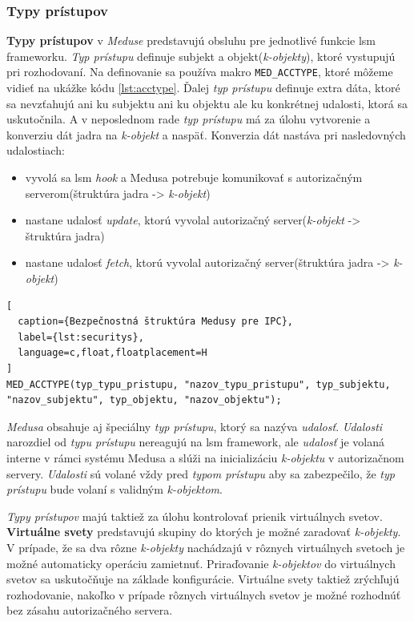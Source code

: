 \subsubsection{Typy prístupov} \label{acctype}
\textbf{Typy prístupov} v \textit{Meduse} predstavujú obsluhu pre jednotlivé funkcie \acrshort{lsm} frameworku. \textit{Typ prístupu} definuje subjekt a objekt(\textit{k-objekty}), ktoré vystupujú pri rozhodovaní. Na definovanie sa používa makro \texttt{MED\_ACCTYPE}, ktoré môžeme vidieť na ukážke kódu \ref{lst:acctype}. Ďalej \textit{typ prístupu} definuje extra dáta, ktoré sa nevzťahujú ani ku subjektu ani ku objektu ale ku konkrétnej udalosti, ktorá sa uskutočnila. A v neposlednom rade \textit{typ prístupu} má za úlohu vytvorenie a konverziu dát jadra na \textit{k-objekt} a naspäť. Konverzia dát nastáva pri nasledovných udalostiach:
\begin{itemize}
\item vyvolá sa \acrshort{lsm} \textit{hook} a Medusa potrebuje komunikovať s autorizačným serverom(štruktúra jadra -> \textit{k-objekt})
\item nastane udalosť \textit{update}, ktorú vyvolal autorizačný server(\textit{k-objekt} -> štruktúra jadra)
\item nastane udalosť \textit{fetch}, ktorú vyvolal autorizačný server(štruktúra jadra -> \textit{k-objekt})
\end{itemize}
\begin{lstlisting}[
  caption={Bezpečnostná štruktúra Medusy pre IPC},
  label={lst:securitys},
  language=c,float,floatplacement=H
]
MED_ACCTYPE(typ_typu_pristupu, "nazov_typu_pristupu", typ_subjektu, "nazov_subjektu", typ_objektu, "nazov_objektu");
\end{lstlisting} 
\textit{Medusa} obsahuje aj špeciálny \textit{typ prístupu}, ktorý sa nazýva \textit{udalosť}. \textit{Udalosti} narozdiel od \textit{typu prístupu} nereagujú na \acrshort{lsm} framework, ale \textit{udalosť} je volaná interne v rámci systému Medusa a slúži na inicializáciu \textit{k-objektu} v autorizačnom servery.\cite{kacer} \textit{Udalosti} sú volané vždy pred \textit{typom prístupu} aby sa zabezpečilo, že \textit{typ prístupu} bude volaní s validným \textit{k-objektom}.

\textit{Typy prístupov} majú taktiež za úlohu kontrolovať prienik virtuálnych svetov. \textbf{Virtuálne svety} predstavujú skupiny do ktorých je možné zaradovať \textit{k-objekty}. V prípade, že sa dva rôzne \textit{k-objekty} nachádzajú v rôznych virtuálnych svetoch je možné automaticky operáciu zamietnuť. Priraďovanie \textit{k-objektov} do virtuálnych svetov sa uskutočňuje na základe konfigurácie. Virtuálne svety taktiež zrýchľujú rozhodovanie, nakoľko v prípade rôznych virtuálnych svetov je možné rozhodnúť bez zásahu autorizačného servera.


